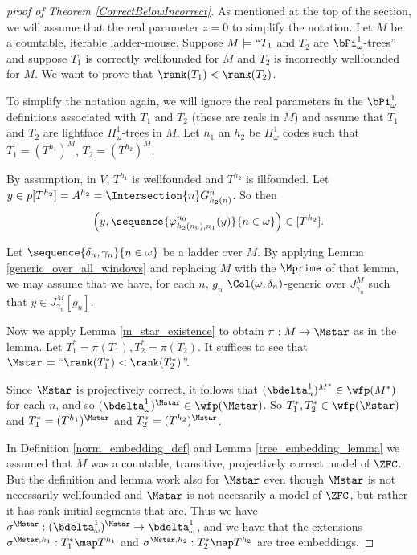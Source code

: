\documentclass[oneside,12pt]{amsart}
\begin{document}
\begin{proof}[proof of Theorem \ref{CorrectBelowIncorrect}]
As mentioned at the top of the section, we will assume that the real parameter
$z=0$ to simplify the notation.
Let $M$ be a countable, iterable ladder-mouse.
Suppose $M\models ``T_1$ and $T_2$ are $\bPi^1_{\omega}$-trees'' and
suppose $T_1$ is correctly wellfounded for $M$ and
$T_2$ is incorrectly wellfounded for $M$. We want to prove that
$\rank(T_1) < \rank(T_2)$.

To simplify the notation again, we will ignore the real parameters
in the
$\bPi^1_{\omega}$ definitions associated with $T_1$ and $T_2$
(these are reals in $M$)
and assume that
$T_1$ and $T_2$ are lightface $\Pi^1_{\omega}$-trees in $M$.
Let $h_1$ an $h_2$ be $\Pi^1_{\omega}$
codes such that $T_1=(T^{h_1})^M$, $T_2=(T^{h_2})^M$.

By assumption, in $V$, $T^{h_1}$ is wellfounded and $T^{h_2}$ is illfounded. Let
$y\in p[T^{h_2}] = A^{h_2} = \Intersection{n} G^n_{h_2(n)}$.
So then
$$\left(y,\sequence{\varphi^{n_0}_{h_2(n_0),n_1}(y)}{n\in\omega} \right)\in[T^{h_2}].$$

Let $\sequence{\delta_n,\gamma_n}{n\in\omega}$ be a ladder over $M$.
By applying Lemma \ref{generic_over_all_windows} and replacing $M$ with the $\Mprime$ of
that lemma, we may assume that we have, for each $n$, $g_n$
$\Col(\omega,\delta_n)$-generic over $J^M_{\gamma_n}$ such that $y\in J^M_{\gamma_n}[g_n]$.

Now we apply Lemma \ref{m_star_existence} to obtain $\pi:M\to\Mstar$ as in
the lemma.
Let $T_1^* = \pi(T_1), T_2^* = \pi(T_2)$.
It suffices to see that $\Mstar\models\text{``}\rank(T_1^*) < \rank(T_2^*)$''.

Since $\Mstar$ is projectively correct, it follows that $(\bdelta^1_n)^{M^*}\in\wfp(M^*)$
for each $n$, and so $(\bdelta^1_{\omega})^{\Mstar}\in\wfp(\Mstar)$. So
$T_1^*,T_2^*\in\wfp(\Mstar)$ and $T_1^* = (T^{h_1})^{\Mstar}$
and $T_2^* = (T^{h_2})^{\Mstar}$.

In Definition \ref{norm_embedding_def} and
Lemma \ref{tree_embedding_lemma} we assumed that $M$ was a countable, transitive, projectively correct model of $\ZFC$. But the definition and lemma work also for $\Mstar$ even though $\Mstar$ is not
necessarily wellfounded and $\Mstar$ is not necesarily a model of $\ZFC$, but rather it has
rank initial segments that are. Thus we have
$\sigma^{\Mstar}:(\bdelta^1_{\omega})^{\Mstar}\to\bdelta^1_{\omega}$, and
we have that the extensions
$\sigma^{\Mstar,h_1}:T_1^*\map T^{h_1}$ and $\sigma^{\Mstar,h_2}:T_2^*\map T^{h_2}$ are tree
embeddings.


\end{proof}
\end{document}
